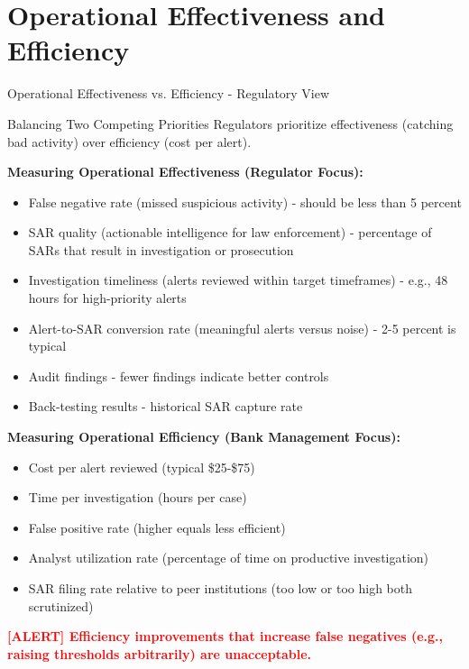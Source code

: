 \documentclass[11pt,a4paper]{beamer}
\newcommand{\redflag}[1]{\textcolor{red}{\textbf{[ALERT] #1}}}
\begin{document}
	\section{Operational Effectiveness and Efficiency}
	
	\begin{frame}{Operational Effectiveness vs. Efficiency - Regulatory View}
		\begin{block}{Balancing Two Competing Priorities}
			Regulators prioritize effectiveness (catching bad activity) over efficiency (cost per alert).
		\end{block}
		
		\textbf{Measuring Operational Effectiveness (Regulator Focus):}
		\begin{itemize}
			\item False negative rate (missed suspicious activity) - should be less than 5 percent
			\item SAR quality (actionable intelligence for law enforcement) - percentage of SARs that result in investigation or prosecution
			\item Investigation timeliness (alerts reviewed within target timeframes) - e.g., 48 hours for high-priority alerts
			\item Alert-to-SAR conversion rate (meaningful alerts versus noise) - 2-5 percent is typical
			\item Audit findings - fewer findings indicate better controls
			\item Back-testing results - historical SAR capture rate
		\end{itemize}
		
		\textbf{Measuring Operational Efficiency (Bank Management Focus):}
		\begin{itemize}
			\item Cost per alert reviewed (typical \$25-\$75)
			\item Time per investigation (hours per case)
			\item False positive rate (higher equals less efficient)
			\item Analyst utilization rate (percentage of time on productive investigation)
			\item SAR filing rate relative to peer institutions (too low or too high both scrutinized)
		\end{itemize}
		
		\redflag{Efficiency improvements that increase false negatives (e.g., raising thresholds arbitrarily) are unacceptable.}
	\end{frame}
	
\end{document}
